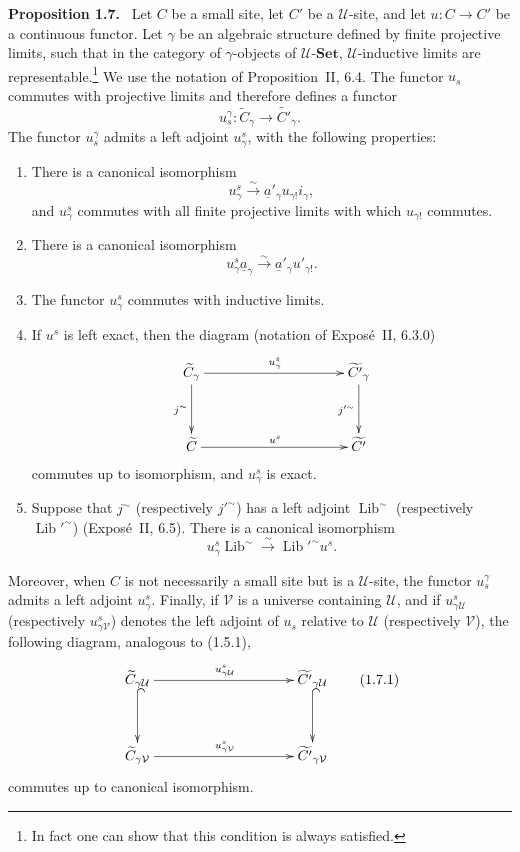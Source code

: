 \documentclass[11pt]{article}
\newcommand{\U}{\mathcal{U}}
\newcommand{\V}{\mathcal{V}}
\newcommand{\Set}{\mathbf{Set}}
\newcommand{\Lib}{\operatorname{Lib}}
\newenvironment{statement}[1]{\par\medskip\noindent\textbf{#1.}\ }{\par\medskip}
\begin{document}
\begin{statement}{Proposition 1.7}
Let \(C\) be a small site, let \(C'\) be a \(\U\)-site, and let \(u:C\to C'\) be a continuous functor. Let \(\gamma\) be an algebraic structure defined by finite projective limits, such that in the category of \(\gamma\)-objects of \(\U\)-\(\Set\), \(\U\)-inductive limits are representable.\footnote{In fact one can show that this condition is always satisfied.} We use the notation of Proposition~II, 6.4. The functor \(u_s\) commutes with projective limits and therefore defines a functor
\[
u_s^{\gamma}:\widetilde C_{\gamma}\to\widetilde{C'}_{\gamma}.
\]
The functor \(u_s^{\gamma}\) admits a left adjoint \(u^s_{\gamma}\), with the following properties:
\begin{enumerate}[label=\arabic*)]
\item There is a canonical isomorphism
\[
u^s_{\gamma}\xrightarrow{\sim}\underline a'_{\gamma}u_{\gamma!}i_{\gamma},
\]
and \(u^s_{\gamma}\) commutes with all finite projective limits with which \(u_{\gamma!}\) commutes.
\item There is a canonical isomorphism
\[
u^s_{\gamma}\underline a_{\gamma}\xrightarrow{\sim}\underline a'_{\gamma}u'_{\gamma!}.
\]
\item The functor \(u^s_{\gamma}\) commutes with inductive limits.
\item If \(u^s\) is left exact, then the diagram (notation of Expos\'e~II, 6.3.0)
\[
\xymatrix@C=3.5cm@R=1.25cm{
\widetilde C_{\gamma}\ar[r]^{u^s_{\gamma}}\ar[d]_{j^{\sim}}& \widetilde{C'}_{\gamma}\ar[d]_{j'^{\sim}}\\
\widetilde C\ar[r]^{u^s}& \widetilde{C'}
}
\]
commutes up to isomorphism, and \(u^s_{\gamma}\) is exact.
\item Suppose that \(j^{\sim}\) (respectively \(j'^{\sim}\)) has a left adjoint \(\Lib^{\sim}\) (respectively \(\Lib'^{\sim}\)) (Expos\'e~II, 6.5). There is a canonical isomorphism
\[
u^s_{\gamma}\Lib^{\sim}\xrightarrow{\sim}\Lib'^{\sim}u^s.
\]
\end{enumerate}
Moreover, when \(C\) is not necessarily a small site but is a \(\U\)-site, the functor \(u_s^{\gamma}\) admits a left adjoint \(u^s_{\gamma}\). Finally, if \(\V\) is a universe containing \(\U\), and if \(u^s_{\gamma\U}\) (respectively \(u^s_{\gamma\V}\)) denotes the left adjoint of \(u_s\) relative to \(\U\) (respectively \(\V\)), the following diagram, analogous to (1.5.1),
\[
\xymatrix@C=3.5cm@R=1.25cm{
\widetilde C_{\gamma\U}\ar[r]^{u^s_{\gamma\U}}\ar@{^{(}->}[d]& \widetilde{C'}_{\gamma\U}\ar@{^{(}->}[d]\\
\widetilde C_{\gamma\V}\ar[r]^{u^s_{\gamma\V}}& \widetilde{C'}_{\gamma\V}
}
\tag{1.7.1}
\]
commutes up to canonical isomorphism.
\end{statement}
\end{document}
